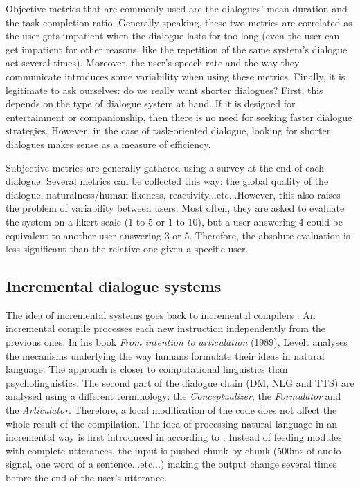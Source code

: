                 Objective metrics that are commonly used are the dialogues' mean duration and the task completion ratio. Generally speaking, these two metrics are correlated as the user gets impatient when the dialogue lasts for too long (even the user can get impatient for other reasons, like the repetition of the same system's dialogue act several times). Moreover, the user's speech rate and the way they communicate introduces some variability when using these metrics. Finally, it is legitimate to ask ourselves: do we really want shorter dialogues? First, this depends on the type of dialogue system at hand. If it is designed for entertainment or companionship, then there is no need for seeking faster dialogue strategies. However, in the case of task-oriented dialogue, looking for shorter dialogues makes sense as a measure of efficiency.

                Subjective metrics are generally gathered using a survey at the end of each dialogue. Several metrics can be collected this way: the global quality of the dialogue, naturalness/human-likeness, reactivity...etc...However, this also raises the problem of variability between users. Most often, they are asked to evaluate the system on a likert scale (1 to 5 or 1 to 10), but a user answering 4 could be equivalent to another user answering 3 or 5. Therefore, the absolute evaluation is less significant than the relative one given a specific user.

	\subsection{Incremental dialogue systems}
    
		The idea of incremental systems goes back to incremental compilers \cite{Lock1965}. An incremental compile processes each new instruction independently from the previous ones. In his book \textit{From intention to articulation} (1989), Levelt analyses the mecanisms underlying the way humans formulate their ideas in natural language. The approach is closer to computational linguistics than psycholinguistics. The second part of the dialogue chain (DM, NLG and TTS) are analysed using a different terminology: the \textit{Conceptualizer}, the \textit{Formulator} and the \textit{Articulator}. Therefore, a local modification of the code does not affect the whole result of the compilation. The idea of processing natural language in an incremental way is first introduced in \cite{Wiren1992} according to \cite{Kilger1995}. Instead of feeding modules with complete utterances, the input is pushed chunk by chunk (500ms of audio signal, one word of a sentence...etc...) making the output change several times before the end of the user's utterance.

